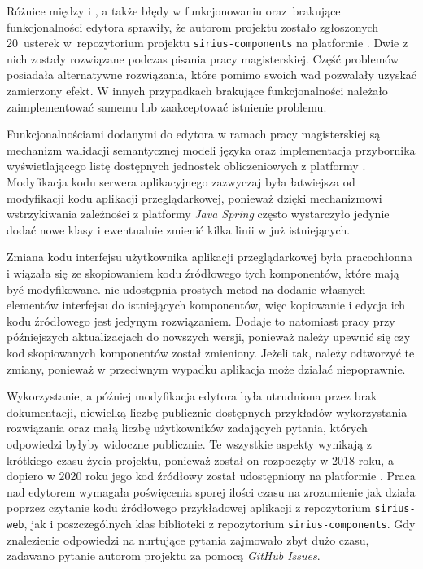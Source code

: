 Różnice między \SiriusWeb{} i \SiriusDesktop{}, a także błędy w
funkcjonowaniu oraz~brakujące funkcjonalności edytora sprawiły, że autorom
projektu zostało zgłoszonych 20~usterek w~repozytorium projektu
\texttt{sirius-components} na platformie \GitHub{}. Dwie z nich zostały
rozwiązane podczas pisania pracy magisterskiej. Część problemów posiadała
alternatywne rozwiązania, które pomimo swoich wad pozwalały uzyskać zamierzony
efekt. W innych przypadkach brakujące funkcjonalności należało zaimplementować
samemu lub zaakceptować istnienie problemu.

Funkcjonalnościami dodanymi do edytora w ramach pracy magisterskiej są
mechanizm walidacji semantycznej modeli języka \CAL{} oraz implementacja
przybornika wyświetlającego listę dostępnych jednostek obliczeniowych z
platformy
\BalticLSC{}. Modyfikacja kodu serwera aplikacyjnego zazwyczaj była
łatwiejsza od modyfikacji kodu aplikacji przeglądarkowej, ponieważ dzięki
mechanizmowi wstrzykiwania zależności z platformy \emph{Java Spring}
często wystarczyło jedynie dodać nowe klasy i ewentualnie zmienić kilka linii w
już istniejących.

Zmiana kodu interfejsu użytkownika aplikacji przeglądarkowej była pracochłonna
i wiązała się ze skopiowaniem kodu źródłowego tych komponentów, które mają być
modyfikowane. \SiriusWeb{} nie udostępnia prostych metod na dodanie
własnych elementów interfejsu do istniejących komponentów, więc kopiowanie i
edycja ich kodu źródłowego jest jedynym rozwiązaniem. Dodaje to natomiast pracy
przy późniejszych aktualizacjach do nowszych wersji, ponieważ należy upewnić
się
czy kod skopiowanych komponentów został zmieniony. Jeżeli tak, należy odtworzyć
te zmiany, ponieważ w przeciwnym wypadku aplikacja może działać niepoprawnie.

Wykorzystanie, a później modyfikacja edytora \SiriusWeb{} była utrudniona
przez brak dokumentacji, niewielką liczbę publicznie dostępnych przykładów
wykorzystania rozwiązania oraz małą liczbę użytkowników zadających pytania,
których odpowiedzi byłyby widoczne publicznie. Te wszystkie aspekty wynikają z
krótkiego czasu życia projektu, ponieważ został on rozpoczęty w 2018 roku, a
dopiero w 2020 roku jego kod źródłowy został udostępniony na platformie
\GitHub{}. Praca nad edytorem wymagała poświęcenia sporej ilości czasu na
zrozumienie jak \SiriusWeb{} działa poprzez czytanie kodu źródłowego
przykładowej aplikacji z repozytorium \texttt{sirius-web}, jak i poszczególnych
klas biblioteki z repozytorium \texttt{sirius-components}. Gdy znalezienie
odpowiedzi na nurtujące pytania zajmowało zbyt dużo czasu, zadawano pytanie
autorom projektu za pomocą \emph{GitHub Issues}.

